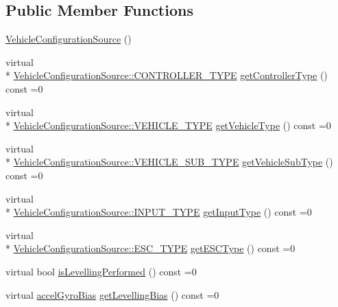\subsection*{Public Member Functions}
\begin{DoxyCompactItemize}
\item 
\hyperlink{group___vehicle_configuration_source_ga56e48ed960f6d5fd24d03e01caaa460b}{Vehicle\-Configuration\-Source} ()
\item 
virtual \\*
\hyperlink{group___vehicle_configuration_source_ga3cfce2b0a501a6fdb7a0ae408ba63556}{Vehicle\-Configuration\-Source\-::\-C\-O\-N\-T\-R\-O\-L\-L\-E\-R\-\_\-\-T\-Y\-P\-E} \hyperlink{group___vehicle_configuration_source_ga7c0552b72e10b1c4f84ffcb926f1bc87}{get\-Controller\-Type} () const =0
\item 
virtual \\*
\hyperlink{group___vehicle_configuration_source_gaa97253587c69ba0d23535abdc42fad43}{Vehicle\-Configuration\-Source\-::\-V\-E\-H\-I\-C\-L\-E\-\_\-\-T\-Y\-P\-E} \hyperlink{group___vehicle_configuration_source_gacfd79047f8c186731eca58056dbb979d}{get\-Vehicle\-Type} () const =0
\item 
virtual \\*
\hyperlink{group___vehicle_configuration_source_gaa22bfa88d750f2b46f66702a723e8342}{Vehicle\-Configuration\-Source\-::\-V\-E\-H\-I\-C\-L\-E\-\_\-\-S\-U\-B\-\_\-\-T\-Y\-P\-E} \hyperlink{group___vehicle_configuration_source_gab3c8f49e774f0b679b21f6f281b3b803}{get\-Vehicle\-Sub\-Type} () const =0
\item 
virtual \\*
\hyperlink{group___vehicle_configuration_source_gae10edd59d3a32fad8c531a1d2346115c}{Vehicle\-Configuration\-Source\-::\-I\-N\-P\-U\-T\-\_\-\-T\-Y\-P\-E} \hyperlink{group___vehicle_configuration_source_gaa63bd09fcc8f30102f720cad79f99e7f}{get\-Input\-Type} () const =0
\item 
virtual \\*
\hyperlink{group___vehicle_configuration_source_ga734c812e17554d4f7ca67f1008abdd6c}{Vehicle\-Configuration\-Source\-::\-E\-S\-C\-\_\-\-T\-Y\-P\-E} \hyperlink{group___vehicle_configuration_source_ga748ecf5409ded5e291f093a48cea7637}{get\-E\-S\-C\-Type} () const =0
\item 
virtual bool \hyperlink{group___vehicle_configuration_source_ga18b570857c0bc2d0e77ad0be0a324f37}{is\-Levelling\-Performed} () const =0
\item 
virtual \hyperlink{structaccel_gyro_bias}{accel\-Gyro\-Bias} \hyperlink{group___vehicle_configuration_source_gae596e5378b9bc9d126c6c6207f473567}{get\-Levelling\-Bias} () const =0

\end{DoxyCompactItemize}
